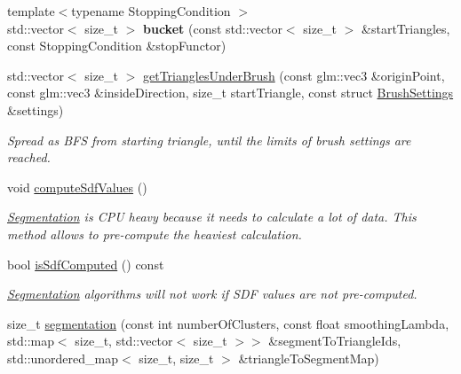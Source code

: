 \begin{DoxyCompactItemize}
{\footnotesize template$<$typename Stopping\+Condition $>$ }\\std\+::vector$<$ size\+\_\+t $>$ {\bfseries bucket} (const std\+::vector$<$ size\+\_\+t $>$ \&start\+Triangles, const Stopping\+Condition \&stop\+Functor)
\item 
std\+::vector$<$ size\+\_\+t $>$ \mbox{\hyperlink{classpepr3d_1_1_geometry_a1d420e96bc8c92c620b5473677173d81}{get\+Triangles\+Under\+Brush}} (const glm\+::vec3 \&origin\+Point, const glm\+::vec3 \&inside\+Direction, size\+\_\+t start\+Triangle, const struct \mbox{\hyperlink{structpepr3d_1_1_brush_settings}{Brush\+Settings}} \&settings)
\begin{DoxyCompactList}\small\item\em Spread as B\+FS from starting triangle, until the limits of brush settings are reached. \end{DoxyCompactList}\item 
\mbox{\label{classpepr3d_1_1_geometry_abba4d7a86b23f0d1a5aef9739d087f7d}} 
void \mbox{\hyperlink{classpepr3d_1_1_geometry_abba4d7a86b23f0d1a5aef9739d087f7d}{compute\+Sdf\+Values}} ()
\begin{DoxyCompactList}\small\item\em \mbox{\hyperlink{classpepr3d_1_1_segmentation}{Segmentation}} is C\+PU heavy because it needs to calculate a lot of data. This method allows to pre-\/compute the heaviest calculation. \end{DoxyCompactList}\item 
\mbox{\label{classpepr3d_1_1_geometry_a4acf91e1482adf0a1a77d03c23c108b3}} 
bool \mbox{\hyperlink{classpepr3d_1_1_geometry_a4acf91e1482adf0a1a77d03c23c108b3}{is\+Sdf\+Computed}} () const
\begin{DoxyCompactList}\small\item\em \mbox{\hyperlink{classpepr3d_1_1_segmentation}{Segmentation}} algorithms will not work if S\+DF values are not pre-\/computed. \end{DoxyCompactList}\item 
\mbox{\label{classpepr3d_1_1_geometry_ab4ef6e071146e7fd4e06c26dac3ffb43}} 
size\+\_\+t \mbox{\hyperlink{classpepr3d_1_1_geometry_ab4ef6e071146e7fd4e06c26dac3ffb43}{segmentation}} (const int number\+Of\+Clusters, const float smoothing\+Lambda, std\+::map$<$ size\+\_\+t, std\+::vector$<$ size\+\_\+t $>$$>$ \&segment\+To\+Triangle\+Ids, std\+::unordered\+\_\+map$<$ size\+\_\+t, size\+\_\+t $>$ \&triangle\+To\+Segment\+Map)
$$
\end{DoxyCompactItemize}
